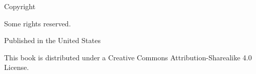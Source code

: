 \pagestyle{empty}

  \begin{center}

  \sffamily

  \makeatletter  \small \thetitle \par \makeatother
  \makeatletter  \small \textit{\thesubtitle} \par \makeatother

    Copyright \ccLogo\ \makeatletter \thedate \ \theauthor \makeatother \par
    Some rights reserved. \par

    \vspace{0.4cm}

    Published in the United States

    \vspace{0.4cm}

    This book is distributed under a Creative Commons Attribution-Sharealike 4.0 License. \par

    \vspace{0.4cm}

    \ccbyncsa

  \end{center}


